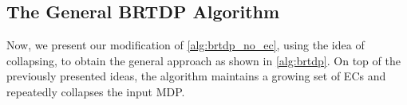 \documentclass{theoretics}
\newcommand{\intersectionSym}{\cap}
\newcommand{\intersectionBin}{\mathbin{\intersectionSym}}
\newcommand{\intersection}{\intersectionBin}
\newcommand{\MDP}{\mathcal{M}}
\newcommand{\initialstate}{\hat{s}}
\DeclareMathOperator{\val}{\mathcal{V}}
\newcommand{\upperbound}{\mathsf{Up}}
\newcommand{\lowerbound}{\mathsf{Lo}}
\newcommand{\targetstate}{s_+}
\newcommand{\sinkstate}{s_-}
\newcommand{\targetset}{T}
\DeclareMathOperator{\collapse}{collapse}
\newcommand{\ecremain}{\mathrm{rem}}
\newcommand{\algoepisode}{\mathsf{e}}
\begin{document}
\subsection{The General BRTDP Algorithm}

Now, we present our modification of \cref{alg:brtdp_no_ec}, using the idea of collapsing, to obtain the general approach as shown in \cref{alg:brtdp}.
On top of the previously presented ideas, the algorithm maintains a growing set of ECs and repeatedly collapses the input MDP.

		
\end{document}
